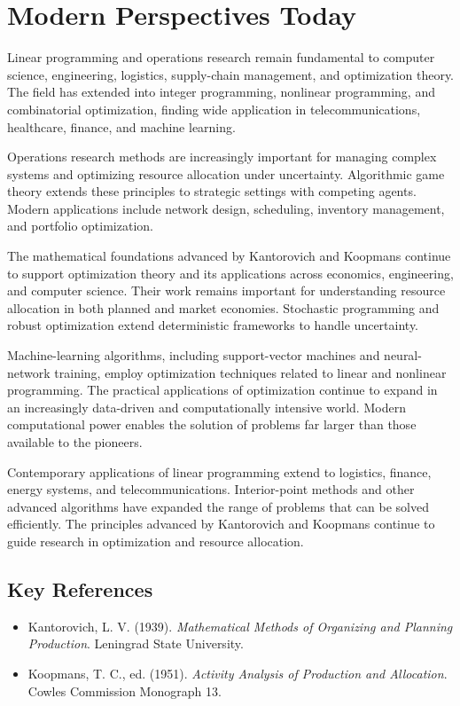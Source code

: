 \section{Modern Perspectives Today}
Linear programming and operations research remain fundamental to computer science, engineering,
logistics, supply-chain management, and optimization theory. The field has extended into integer
programming, nonlinear programming, and combinatorial optimization, finding wide application in
telecommunications, healthcare, finance, and machine learning.

Operations research methods are increasingly important for managing complex systems and
optimizing resource allocation under uncertainty. Algorithmic game theory extends these
principles to strategic settings with competing agents. Modern applications include network
design, scheduling, inventory management, and portfolio optimization.

The mathematical foundations advanced by Kantorovich and Koopmans continue to support optimization
theory and its applications across economics, engineering, and computer science. Their work
remains important for understanding resource allocation in both planned and market economies.
Stochastic programming and robust optimization extend deterministic frameworks to handle
uncertainty.

Machine-learning algorithms, including support-vector machines and neural-network training, employ
optimization techniques related to linear and nonlinear programming. The practical applications
of optimization continue to expand in an increasingly data-driven and computationally intensive
world. Modern computational power enables the solution of problems far larger than those available
to the pioneers.

Contemporary applications of linear programming extend to logistics, finance, energy systems, and
telecommunications. Interior-point methods and other advanced algorithms have expanded the range
of problems that can be solved efficiently. The principles advanced by Kantorovich and Koopmans
continue to guide research in optimization and resource allocation.

\subsection*{Key References}
\begin{itemize}
    \item Kantorovich, L. V. (1939). \textit{Mathematical Methods of Organizing and Planning
    Production}. Leningrad State University.
    \item Koopmans, T. C., ed. (1951). \textit{Activity Analysis of Production and Allocation}.
    Cowles Commission Monograph 13.
\end{itemize}
